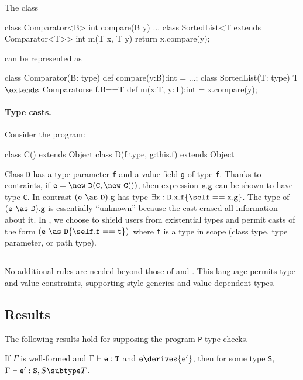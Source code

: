 \begin{example}
\noindent The \FGJ{} class 
\begin{xten} 
class Comparator<B> {
  int compare(B y) { ... } }
class SortedList<T extends Comparator<T>> { 
  int m(T x, T y) {
     return x.compare(y); } }
\end{xten}
\noindent can be represented as
\begin{xtenmath} 
class Comparator(B: type) {
  def compare(y:B):int = ...; }
class SortedList(T: type)
    {T $\extends$ Comparator{self.B==T}} { 
  def m(x:T, y:T):int = x.compare(y); }
\end{xtenmath}
\end{example}

\paragraph{Type casts.} 
Consider the program:
\begin{xten}
class C() extends Object {}
class D(f:type, g:this.f) extends Object {}
\end{xten}
Class {\tt D} has a type parameter {\tt f} and a value field {\tt g} of type {\tt f}.
Thanks to contraints, if
${\tt e}=\new~{\tt D}({\tt C},\new~{\tt C}())$,
then expression ${\tt e}.{\tt g}$ can be shown to
have type {\tt C}.
In contrast $({\tt e}~\as~{\tt D}).{\tt g}$ has type
$\exists {\tt x}:{\tt D}.{\tt x}.{\tt f}\{\self=={\tt x.g}\}$.
The type of $({\tt e}~\as~{\tt D}).{\tt g}$ is essentially ``unknown''
because the cast erased all information about it. In \Xten, we choose to shield users from existential types and permit casts of the form $({\tt e}~\as~{\tt D}\{\self.{\tt f}=={\tt t}\})$ where {\tt t} is a type in scope (class type, type parameter, or path type).


\subsection{\FXGD} 

No additional rules are needed beyond those of \FXG{} and \FXD{}. This
language permits type and value constraints, supporting \FGJ{} style
generics and value-dependent types.

\subsection{Results}
The following results hold for \FXGD supposing the program {\tt P} type checks.

\begin{theorem} If $\Gamma$ is well-formed and $\Gamma \vdash {\tt e:T}$ and ${\tt e} \derives {\tt e'}$, then
for some type {\tt S}, $\Gamma \vdash {\tt e':S},{S \subtype T}$.
\end{theorem}

